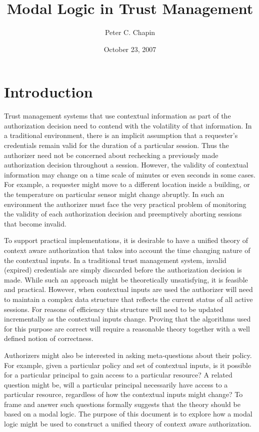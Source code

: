 \documentclass{article}
\begin{document}
\title{Modal Logic in Trust Management}
\author{Peter C. Chapin}
\date{October 23, 2007}
\maketitle

\section{Introduction}

Trust management systems that use contextual information as part of the authorization decision
need to contend with the volatility of that information. In a traditional environment, there is
an implicit assumption that a requester's credentials remain valid for the duration of a
particular session. Thus the authorizer need not be concerned about rechecking a previously made
authorization decision throughout a session. However, the validity of contextual information may
change on a time scale of minutes or even seconds in some cases. For example, a requester might
move to a different location inside a building, or the temperature on particular sensor might
change abruptly. In such an environment the authorizer must face the very practical problem of
monitoring the validity of each authorization decision and preemptively aborting sessions that
become invalid.

To support practical implementations, it is desirable to have a unified theory of context aware
authorization that takes into account the time changing nature of the contextual inputs. In a
traditional trust management system, invalid (expired) credentials are simply discarded before
the authorization decision is made. While such an approach might be theoretically unsatisfying,
it is feasible and practical. However, when contextual inputs are used the authorizer will need
to maintain a complex data structure that reflects the current status of all active sessions.
For reasons of efficiency this structure will need to be updated incrementally as the contextual
inputs change. Proving that the algorithms used for this purpose are correct will require a
reasonable theory together with a well defined notion of correctness.

Authorizers might also be interested in asking meta-questions about their policy. For example,
given a particular policy and set of contextual inputs, is it possible for a particular
principal to gain access to a particular resource? A related question might be, will a
particular principal necessarily have access to a particular resource, regardless of how the
contextual inputs might change? To frame and answer such questions formally suggests that the
theory should be based on a modal logic. The purpose of this document is to explore how a modal
logic might be used to construct a unified theory of context aware authorization.
\end{document}
